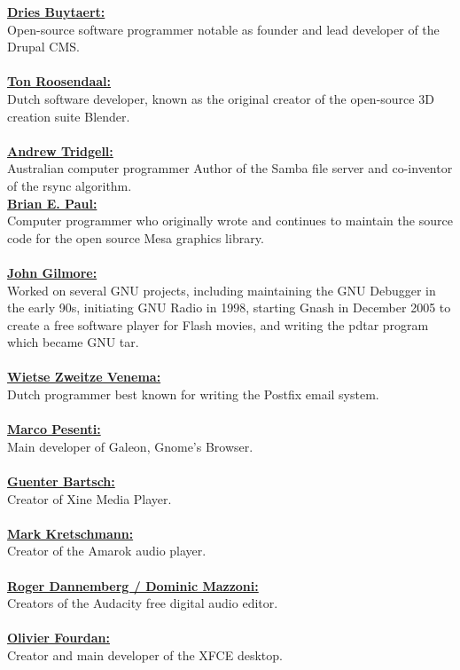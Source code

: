 \documentclass[10pt, a4paper, oneside]{report}
\begin{document}
\textbf{\underline{Dries Buytaert:}}\\
Open-source software programmer notable as founder and lead developer of the Drupal CMS.\\
\\
\textbf{\underline{Ton Roosendaal:}}\\
Dutch software developer, known as the original creator of the open-source 3D creation suite Blender.\\
\\
\textbf{\underline{Andrew Tridgell:}}\\
Australian computer programmer Author of the Samba file server and co-inventor of the rsync algorithm.\\
\textbf{\underline{Brian E. Paul:}}\\
Computer programmer who originally wrote and continues to maintain the source code for the open source Mesa graphics library.\\
\\
\textbf{\underline{John Gilmore:}}\\
Worked on several GNU projects, including maintaining the GNU Debugger in the early 90s, initiating GNU Radio in 1998, starting Gnash in December 2005 to create a free software player for Flash movies, and writing the pdtar program which became GNU tar.\\
\\
\textbf{\underline{Wietse Zweitze Venema:}}\\
Dutch programmer best known for writing the Postfix email system.\\
\\
\textbf{\underline{Marco Pesenti:}}\\
Main developer of Galeon, Gnome's Browser.\\
\\
\textbf{\underline{Guenter Bartsch:}}\\
Creator of Xine Media Player.\\
\\
\textbf{\underline{Mark Kretschmann:}}\\
Creator of the Amarok audio player.\\
\\
\textbf{\underline{Roger Dannemberg / Dominic Mazzoni:}}\\
Creators of the Audacity free digital audio editor.\\
\\
\textbf{\underline{Olivier Fourdan:}}\\
Creator and main developer of the XFCE desktop.\\
\end{document}
